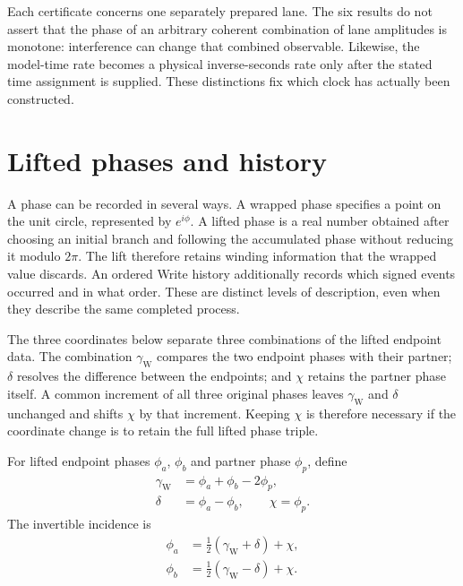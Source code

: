\documentclass[10pt,twocolumn,letterpaper]{article}
\begin{document}
Each certificate concerns one separately prepared lane. The six results do not assert that the phase of an arbitrary coherent combination of lane amplitudes is monotone: interference can change that combined observable. Likewise, the model-time rate becomes a physical inverse-seconds rate only after the stated time assignment is supplied. These distinctions fix which clock has actually been constructed.

\section{Lifted phases and history}


A phase can be recorded in several ways. A wrapped phase specifies a point on the unit circle, represented by $e^{i\phi}$. A lifted phase is a real number obtained after choosing an initial branch and following the accumulated phase without reducing it modulo $2\pi$. The lift therefore retains winding information that the wrapped value discards. An ordered Write history additionally records which signed events occurred and in what order. These are distinct levels of description, even when they describe the same completed process.

The three coordinates below separate three combinations of the lifted endpoint data. The combination $\gamma_{\mathrm W}$ compares the two endpoint phases with their partner; $\delta$ resolves the difference between the endpoints; and $\chi$ retains the partner phase itself. A common increment of all three original phases leaves $\gamma_{\mathrm W}$ and $\delta$ unchanged and shifts $\chi$ by that increment. Keeping $\chi$ is therefore necessary if the coordinate change is to retain the full lifted phase triple.

For lifted endpoint phases $\phi_a$, $\phi_b$ and partner phase $\phi_p$, define
\begin{equation}
\begin{aligned}
\gamma_{\mathrm{W}}&=\phi_a+\phi_b-2\phi_p,\\
\delta&=\phi_a-\phi_b,\qquad \chi=\phi_p.
\end{aligned}
\tag{1}
\end{equation}
The invertible incidence is
\begin{equation}
\begin{aligned}
\phi_a&=\frac{1}{2}(\gamma_{\mathrm{W}}+\delta)+\chi,\\
\phi_b&=\frac{1}{2}(\gamma_{\mathrm{W}}-\delta)+\chi.
\end{aligned}
\tag{2}
\end{equation}
\end{document}
